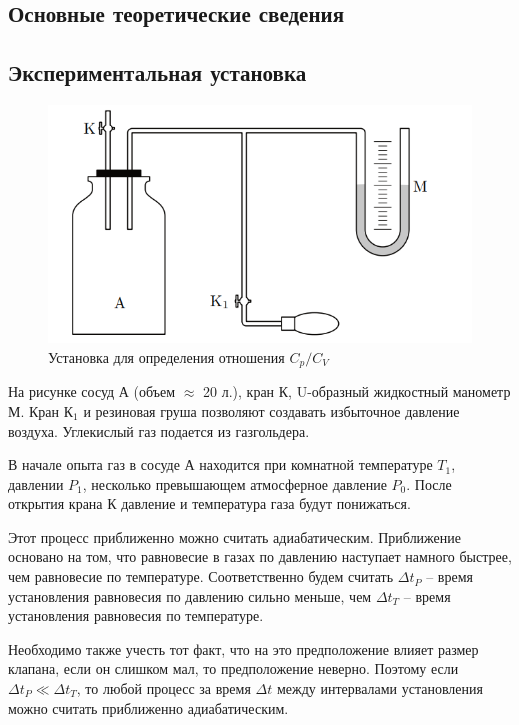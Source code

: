 \documentclass[a4paper,12pt]{report}
\begin{document}
    \begin{multicols}{2}    
    \section{Основные теоретические сведения}
    \subsection*{Экспериментальная установка}
        \begin{figure}[H]
            \includegraphics*[width=0.9\columnwidth]{ustanovka.png}
            \centering
            \caption{Установка для определения отношения $C_p/C_V$}
        \end{figure}
        На рисунке сосуд А (объем $\approx$ 20 л.), кран К, U-образный жидкостный манометр М. Кран К$_1$ и резиновая груша позволяют создавать избыточное давление воздуха. Углекислый газ подается из газгольдера.

        В начале опыта газ в сосуде А находится при комнатной температуре $T_1$, давлении $P_1$, несколько превышающем атмосферное давление $P_0$. После открытия крана К давление и температура газа будут понижаться.

        Этот процесс приближенно можно считать адиабатическим. Приближение основано на том, что равновесие в газах по давлению наступает намного быстрее, чем равновесие по температуре. Соответственно будем считать $\Delta t_P$ -- время установления равновесия по давлению сильно меньше, чем $\Delta t_T$ -- время установления равновесия по температуре.

        Необходимо также учесть тот факт, что на это предположение влияет размер клапана, если он слишком мал, то предположение неверно. Поэтому если $\Delta t_P \ll \Delta t_T$, то любой процесс за время $\Delta t$ между интервалами установления можно считать приближенно адиабатическим.


\end{multicols}
\end{document}
